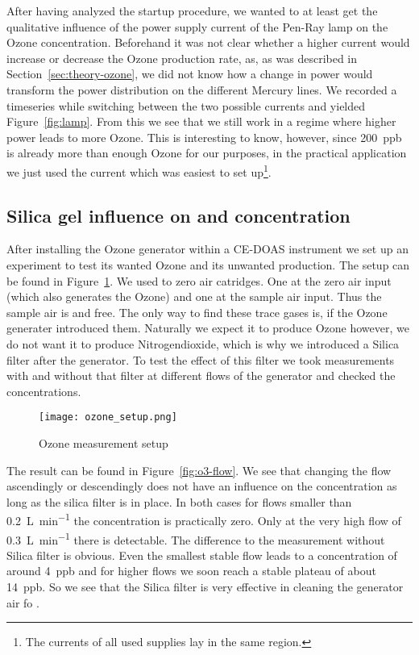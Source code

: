 After having analyzed the startup procedure, we wanted to at least get
the qualitative influence of the power supply current of the Pen-Ray
lamp on the Ozone concentration. Beforehand it was not clear whether a
higher current would increase or decrease the Ozone production rate,
as, as was described in Section~\ref{sec:theory-ozone}, we did not
know how a change in power would transform the power distribution on
the different Mercury lines. We recorded a timeseries while switching
between the two possible currents and yielded
Figure~\ref{fig:lamp}. From this we see that we still work in a regime
where higher power leads to more Ozone. This is interesting to know,
however, since \SI{200}{ppb} is already more than enough Ozone for our
purposes, in the practical application we just used the current
which was easiest to set up\footnote{The currents of all used supplies
  lay in the same region.}.

\subsection{Silica gel influence on  and  concentration}
\label{sec:silica}

After installing the Ozone generator within a CE-DOAS instrument we
set up an experiment to test its wanted Ozone and its unwanted
 production. The setup can be found in
Figure~\ref{fig:ozone-flow-setup}. We used to zero air catridges. One
at the zero air input (which also generates the Ozone) and one at the
sample air input. Thus the sample air is  and 
free. The only way to find these trace gases is, if the Ozone
generater introduced them. Naturally we expect it to produce Ozone
however, we do not want it to produce Nitrogendioxide, which is why we
introduced a Silica filter after the generator. To test the effect of
this filter we took measurements with and without that filter at
different flows of the generator and checked the concentrations.

\begin{figure}[htbp]
  \centering
  \texttt{[image: ozone\_setup.png]}
  \caption{Ozone measurement setup}
  \label{fig:ozone-flow-setup}
\end{figure}

The result can be found in Figure~\ref{fig:o3-flow}. We see that
changing the flow ascendingly or descendingly does not have an
influence on the  concentration as long as the silica filter
is in place. In both cases for flows smaller than
\SI{0.2}{\liter\per\minute} the concentration is practically
zero. Only at the very high flow of \SI{0.3}{\liter\per\minute} there
is  detectable. The difference to the measurement without
Silica filter is obvious. Even the smallest stable flow leads to a
concentration of around \SI{4}{ppb} and for higher flows we soon reach
a stable plateau of about \SI{14}{ppb}. So we see that the Silica
filter is very effective in cleaning the generator air fo .

